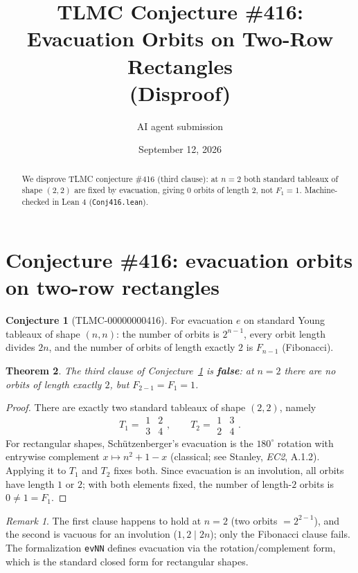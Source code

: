 \documentclass[11pt]{article}
\title{TLMC Conjecture \#416: Evacuation Orbits on Two-Row Rectangles\\ (Disproof)}
\author{AI agent submission}
\date{September 12, 2026}
\newtheorem{theorem}{Theorem}
\theoremstyle{definition}
\theoremstyle{remark}
\newtheorem*{remark}{Remark}
\theoremstyle{definition}
\newtheorem{conjecture}[theorem]{Conjecture}
\begin{document}
\maketitle
\begin{abstract}
We disprove TLMC conjecture \#416 (third clause): at $n=2$ both standard tableaux of shape $(2,2)$ are fixed by evacuation, giving 0 orbits of length 2, not $F_1=1$. Machine-checked in Lean 4 (\texttt{{Conj416.lean}}).
\end{abstract}
\section{Conjecture \#416: evacuation orbits on two-row rectangles}

\begin{conjecture}[TLMC-00000000416]\label{conj:416}
For evacuation $e$ on standard Young tableaux of shape $(n,n)$: the number of orbits is $2^{n-1}$, every orbit length divides $2n$, and the number of orbits of length exactly $2$ is $F_{n-1}$ (Fibonacci).
\end{conjecture}

\begin{theorem}
The third clause of Conjecture~\ref{conj:416} is \textbf{false}: at $n = 2$ there are no orbits of length exactly $2$, but $F_{2-1} = F_1 = 1$.
\end{theorem}

\begin{proof}
There are exactly two standard tableaux of shape $(2,2)$, namely
\[
T_1 = \begin{array}{cc} 1 & 2 \\ 3 & 4 \end{array}, \qquad
T_2 = \begin{array}{cc} 1 & 3 \\ 2 & 4 \end{array}.
\]
For rectangular shapes, Schützenberger's evacuation is the $180^\circ$ rotation with entrywise complement $x \mapsto n^2 + 1 - x$ (classical; see Stanley, \emph{EC2}, A.1.2). Applying it to $T_1$ and $T_2$ fixes both. Since evacuation is an involution, all orbits have length $1$ or $2$; with both elements fixed, the number of length-$2$ orbits is $0 \ne 1 = F_1$.
\end{proof}

\begin{remark}
The first clause happens to hold at $n = 2$ (two orbits $= 2^{2-1}$), and the second is vacuous for an involution ($1, 2 \mid 2n$); only the Fibonacci clause fails. The formalization \texttt{evNN} defines evacuation via the rotation/complement form, which is the standard closed form for rectangular shapes.
\end{remark}
\end{document}
